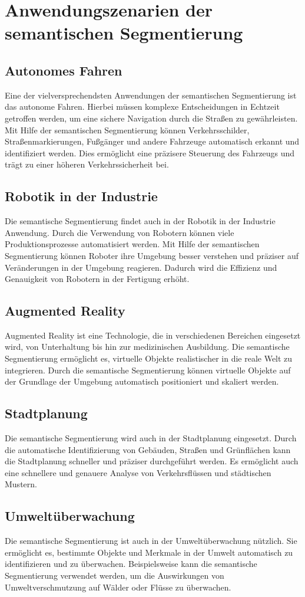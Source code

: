 \chapter{Anwendungszenarien der semantischen Segmentierung}
\section{Autonomes Fahren}
Eine der vielversprechendsten Anwendungen der semantischen Segmentierung ist
das autonome Fahren. Hierbei müssen komplexe Entscheidungen in Echtzeit
getroffen werden, um eine sichere Navigation durch die Straßen zu
gewährleisten. Mit Hilfe der semantischen Segmentierung können
Verkehrsschilder, Straßenmarkierungen, Fußgänger und andere Fahrzeuge
automatisch erkannt und identifiziert werden. Dies ermöglicht eine präzisere
Steuerung des Fahrzeugs und trägt zu einer höheren Verkehrssicherheit bei.
\section{Robotik in der Industrie}
Die semantische Segmentierung findet auch in der Robotik in der Industrie
Anwendung. Durch die Verwendung von Robotern können viele Produktionsprozesse
automatisiert werden. Mit Hilfe der semantischen Segmentierung können Roboter
ihre Umgebung besser verstehen und präziser auf Veränderungen in der Umgebung
reagieren. Dadurch wird die Effizienz und Genauigkeit von Robotern in der
Fertigung erhöht.
\section{Augmented Reality}
Augmented Reality ist eine Technologie, die in verschiedenen Bereichen
eingesetzt wird, von Unterhaltung bis hin zur medizinischen Ausbildung. Die
semantische Segmentierung ermöglicht es, virtuelle Objekte realistischer in die
reale Welt zu integrieren. Durch die semantische Segmentierung können virtuelle
Objekte auf der Grundlage der Umgebung automatisch positioniert und skaliert
werden.
\section{Stadtplanung}
Die semantische Segmentierung wird auch in der Stadtplanung eingesetzt. Durch
die automatische Identifizierung von Gebäuden, Straßen und Grünflächen kann die
Stadtplanung schneller und präziser durchgeführt werden. Es ermöglicht auch
eine schnellere und genauere Analyse von Verkehrsflüssen und städtischen
Mustern.
\section{Umweltüberwachung}
Die semantische Segmentierung ist auch in der Umweltüberwachung nützlich. Sie
ermöglicht es, bestimmte Objekte und Merkmale in der Umwelt automatisch zu
identifizieren und zu überwachen. Beispielsweise kann die semantische
Segmentierung verwendet werden, um die Auswirkungen von Umweltverschmutzung auf
Wälder oder Flüsse zu überwachen.